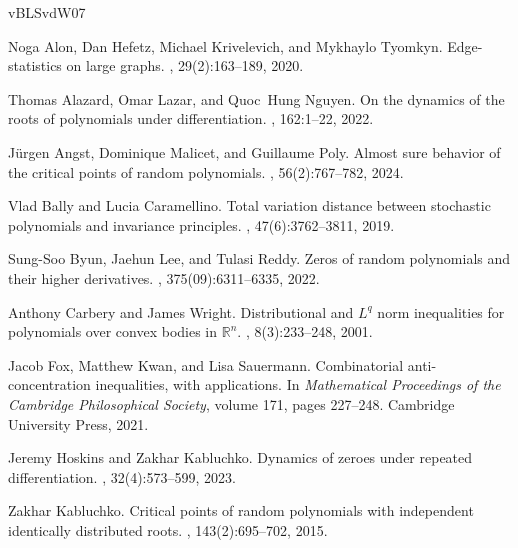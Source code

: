 \documentclass[12pt, reqno]{amsart}
\theoremstyle{plain}
\theoremstyle{definition}
\begin{document}
 
 
\begin{thebibliography}{vBLSvdW07}

Noga Alon, Dan Hefetz, Michael Krivelevich, and Mykhaylo Tyomkyn.
\newblock Edge-statistics on large graphs.
, 29(2):163--189, 2020.

Thomas Alazard, Omar Lazar, and Quoc~Hung Nguyen.
\newblock On the dynamics of the roots of polynomials under differentiation.
,
  162:1--22, 2022.

J{\"u}rgen Angst, Dominique Malicet, and Guillaume Poly.
\newblock Almost sure behavior of the critical points of random polynomials.
, 56(2):767--782,
  2024.

Vlad Bally and Lucia Caramellino.
\newblock Total variation distance between stochastic polynomials and
  invariance principles.
, 47(6):3762--3811, 2019.

Sung-Soo Byun, Jaehun Lee, and Tulasi Reddy.
\newblock Zeros of random polynomials and their higher derivatives.
,
  375(09):6311--6335, 2022.

Anthony Carbery and James Wright.
\newblock Distributional and ${L}^q$ norm inequalities for polynomials over
  convex bodies in $\mathbb{R}^n$.
, 8(3):233--248, 2001.

Jacob Fox, Matthew Kwan, and Lisa Sauermann.
\newblock Combinatorial anti-concentration inequalities, with applications.
\newblock In {\em Mathematical Proceedings of the Cambridge Philosophical
  Society}, volume 171, pages 227--248. Cambridge University Press, 2021.

Jeremy Hoskins and Zakhar Kabluchko.
\newblock Dynamics of zeroes under repeated differentiation.
, 32(4):573--599, 2023.

Zakhar Kabluchko.
\newblock Critical points of random polynomials with independent identically
  distributed roots.
,
  143(2):695--702, 2015.


\end{thebibliography}
\end{document}
